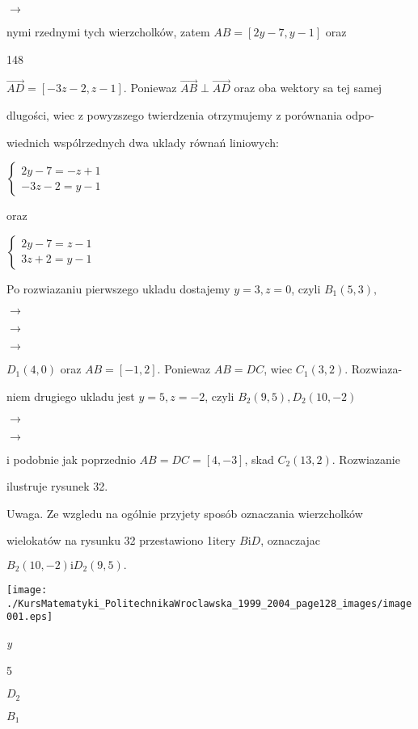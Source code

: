 \documentclass[a4paper,12pt]{article}
\begin{document}
$\rightarrow$

nymi rzednymi tych wierzcholków, zatem $AB= [2y-7,y-1]$ oraz





148

$\vec{AD}= [-3z-2,z-1]$. Poniewaz $\vec{AB}\perp\vec{AD}$ oraz oba wektory sa tej samej

dlugości, wiec $\mathrm{z}$ powyzszego twierdzenia otrzymujemy $\mathrm{z}$ porównania odpo-

wiednich wspólrzednych dwa uklady równań liniowych:

$\left\{\begin{array}{l}
2y-7=-z+1\\
-3z-2=y-1
\end{array}\right.$

oraz

$\left\{\begin{array}{l}
2y-7=z-1\\
3z+2=y-1
\end{array}\right.$

Po rozwiazaniu pierwszego ukladu dostajemy $y=3, z=0$, czyli $B_{1}(5,3),$

$\rightarrow$

$\rightarrow$

$\rightarrow$

$D_{1}(4,0)$ oraz $AB= [-1,2]$. Poniewaz $AB=DC$, wiec $C_{1}(3,2)$. Rozwiaza-

niem drugiego ukladu jest $y = 5, z = -2$, czyli $B_{2}(9,5), D_{2}(10,-2)$

$\rightarrow$

$\rightarrow$

$\mathrm{i}$ podobnie jak poprzednio $AB=DC=[4,-3]$, skad $C_{2}(13,2)$. Rozwiazanie

ilustruje rysunek 32.

Uwaga. Ze wzgledu na ogólnie przyjety sposób oznaczania wierzcholków

wielokatów na rysunku 32 przestawiono 1itery $B \mathrm{i} D$, oznaczajac

$B_{2}(10,-2)\mathrm{i}D_{2}(9,5).$
\begin{center}
\texttt{[image: ./KursMatematyki\_PolitechnikaWroclawska\_1999\_2004\_page128\_images/image001.eps]}
\end{center}
{\it y}

5

$D_{2}$

$B_{1}$
\end{document}
